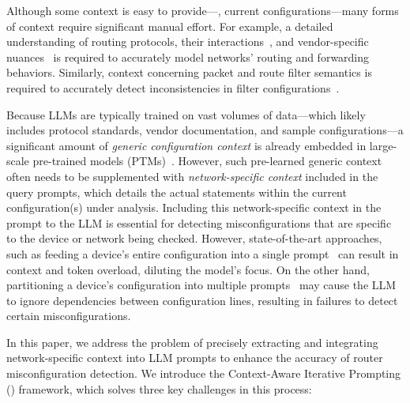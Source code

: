 Although some context is easy to provide---\eg, current
config\-urations---many forms of context require significant manual effort.
For example, a detailed understanding of routing protocols, their
interactions~\cite{le2007rr}, and vendor-specific nuances~\cite{ye2020hoyan}
is required to accurately model networks' routing and forwarding behaviors.
Similarly, context concerning packet and route filter semantics is required to
accurately detect inconsistencies in filter
configurations~\cite{kakarla2020finding}.

Because LLMs are typically trained on vast volumes of data---which likely
includes protocol standards, vendor documentation, and sample
configurations---a significant amount of \textit{generic configuration
context} is already embedded in large-scale pre-trained models
(PTMs)~\cite{qiu2020pre}. However, such pre-learned generic context often
needs to be supplemented with \textit{network-specific context} included in the query prompts, which details
the actual statements within the current configuration(s) under
analysis. 
Including this network-specific context in the prompt to the LLM is essential
for detecting misconfigurations that are specific to the device or network
being checked.
However, state-of-the-art 
approaches, such as feeding a device's entire configuration into a single
prompt~\cite{lican,li2024long} can result in context and token overload,
diluting the model's focus. On the other hand, partitioning a
device's configuration into multiple
prompts~\cite{lian2023configuration,chen2024automatic,wang2024identifying}
may cause the LLM to ignore dependencies between configuration lines,
resulting in failures to detect certain misconfigurations.


In this paper, we address the problem of precisely extracting and integrating network-specific context into LLM prompts to enhance the accuracy of router misconfiguration detection. We introduce the
Context-Aware Iterative Prompting (\sysname{}) framework, which
solves three key challenges in this process:

